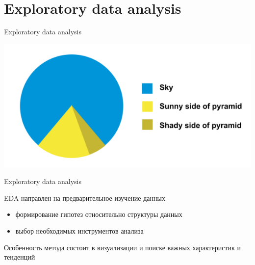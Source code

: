 \documentclass[aspectratio=169]{beamer}
\begin{document}
\section{Exploratory data analysis}

\begin{frame}{}

\begin{center}
{\LARGE Exploratory data analysis}

\vspace{2em}
\includegraphics[scale=0.4]{images/piechart.png}
\end{center}

\end{frame}

\begin{frame}{Exploratory data analysis}

EDA направлен на предварительное изучение данных
\begin{itemize}
\item формирование гипотез относительно структуры данных
\item выбор необходимых инструментов анализа
\end{itemize}
Особенность метода состоит в визуализации и поиске важных характеристик и тенденций

\end{frame}
\end{document}
